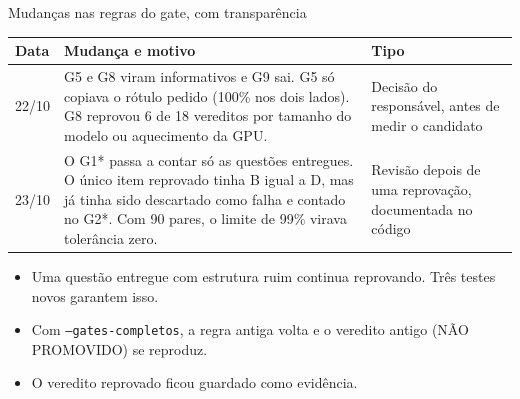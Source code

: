 \documentclass[aspectratio=169,11pt]{beamer}
\begin{document}
\begin{frame}{Mudanças nas regras do gate, com transparência}
  \small
  \begin{tabularx}{\textwidth}{@{}lX>{\raggedright\arraybackslash}p{3.3cm}@{}}
    \toprule
    Data & Mudança e motivo & Tipo \\
    \midrule
    22/10 & G5 e G8 viram informativos e G9 sai. G5 só copiava o rótulo pedido (100\% nos dois lados).
            G8 reprovou 6 de 18 vereditos por tamanho do modelo ou aquecimento da GPU. & Decisão do responsável, antes de medir o candidato \\
    23/10 & O G1* passa a contar só as questões entregues. O único item reprovado tinha B igual a D, mas já tinha sido
            descartado como falha e contado no G2*. Com 90 pares, o limite de 99\% virava tolerância zero. & Revisão depois de uma reprovação, documentada no código \\
    \bottomrule
  \end{tabularx}
  \vspace{6pt}

  \begin{itemize}\small
    \item Uma questão entregue com estrutura ruim continua reprovando. Três testes novos garantem isso.
    \item Com \texttt{--gates-completos}, a regra antiga volta e o veredito antigo (NÃO PROMOVIDO) se reproduz.
    \item O veredito reprovado ficou guardado como evidência.
  \end{itemize}
\end{frame}

\end{document}
